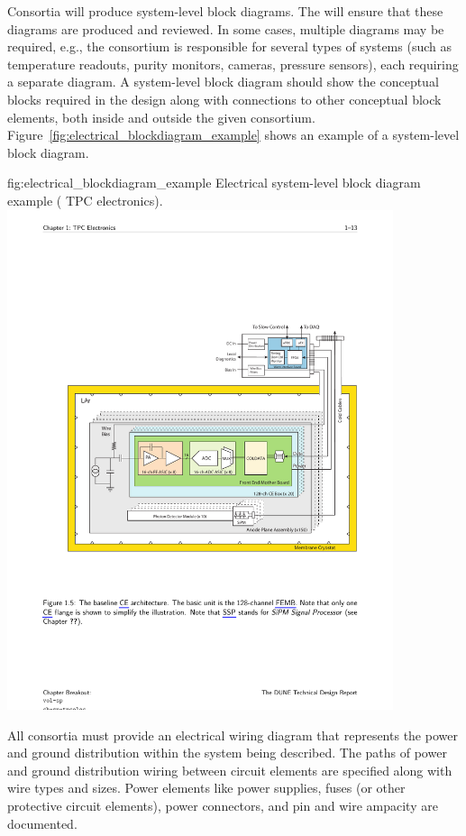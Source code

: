Consortia will produce system-level block diagrams. The 
will ensure that these diagrams are produced and reviewed.  In some
cases, multiple diagrams may be required, e.g., the 
consortium is responsible for several types of systems (such as
temperature readouts, purity monitors, cameras, pressure sensors),
each requiring a separate diagram. A system-level block diagram should
show the conceptual blocks required in the design along with
connections to other conceptual block elements, both inside and
outside the given consortium.
Figure~\ref{fig:electrical_blockdiagram_example} shows an example of a
system-level block diagram.
\begin{dunefigure}{fig:electrical_blockdiagram_example}
  {Electrical system-level block diagram example ( TPC electronics).}
 \includegraphics[width=0.85\textwidth]{graphics/Example_System_Level_Block-Diagram-SP_Cold_Electronics.pdf}
\end{dunefigure}


All consortia must provide an electrical wiring diagram that 
represents the power and ground distribution within the system being
described.  The paths of power and ground distribution wiring between
circuit elements are specified along with wire types and sizes.  Power
elements like power supplies, fuses (or other protective circuit
elements), power connectors, and pin and wire ampacity are documented.


